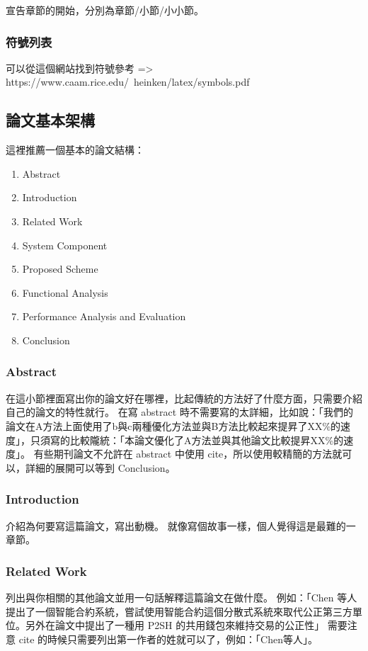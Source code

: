 宣告章節的開始，分別為章節/小節/小小節。

\subsubsection{符號列表}

可以從這個網站找到符號參考 => https://www.caam.rice.edu/~heinken/latex/symbols.pdf

\subsection{論文基本架構}

這裡推薦一個基本的論文結構：
\begin{enumerate}
	\item Abstract
	\item Introduction
	\item Related Work
	\item System Component
	\item Proposed Scheme
	\item Functional Analysis
	\item Performance Analysis and Evaluation
	\item Conclusion
\end{enumerate}

\subsubsection{Abstract}

在這小節裡面寫出你的論文好在哪裡，比起傳統的方法好了什麼方面，只需要介紹自己的論文的特性就行。
在寫 abstract 時不需要寫的太詳細，比如說：「我們的論文在A方法上面使用了b與c兩種優化方法並與B方法比較起來提昇了XX\%的速度」，只須寫的比較隴統：「本論文優化了A方法並與其他論文比較提昇XX\%的速度」。
有些期刊論文不允許在 abstract 中使用 cite，所以使用較精簡的方法就可以，詳細的展開可以等到 Conclusion。

\subsubsection{Introduction}

介紹為何要寫這篇論文，寫出動機。
就像寫個故事一樣，個人覺得這是最難的一章節。

\subsubsection{Related Work}

列出與你相關的其他論文並用一句話解釋這篇論文在做什麼。
例如：「Chen 等人\cite{9394011}提出了一個智能合約系統，嘗試使用智能合約這個分散式系統來取代公正第三方單位。另外在\cite{7589035}論文中提出了一種用 P2SH 的共用錢包來維持交易的公正性」
需要注意 cite 的時候只需要列出第一作者的姓就可以了，例如：「Chen等人\cite{9394011}」。

